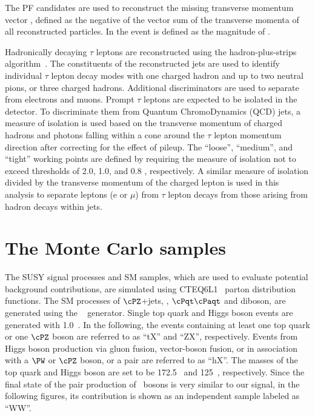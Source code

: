 The PF candidates are used to reconstruct the missing transverse momentum  vector \ptvecmiss, defined as the negative of the vector sum of the transverse momenta of all reconstructed particles.  
In the event \MPT is defined as the magnitude of \ptvecmiss.

Hadronically decaying $\tau$ leptons are reconstructed using the hadron-plus-strips algorithm~\cite{Khachatryan:2015dfa}.
The constituents of the reconstructed jets are used to identify individual $\tau$ lepton decay modes with one charged 
hadron and up to two neutral pions, or three charged hadrons. 
Additional discriminators are used to separate \Tau from electrons and muons.
Prompt $\tau$ leptons are expected to be isolated in the detector.
To discriminate them from Quantum ChromoDynamics (QCD) jets, a measure of isolation \cite{Khachatryan:2014wca} is used 
based on the transverse momentum of charged hadrons and photons falling within 
a cone around the $\tau$ lepton momentum direction after correcting for the effect of
pileup. The ``loose'', ``medium'', and ``tight'' working points are defined
by requiring the measure of isolation not to exceed thresholds of 2.0, 1.0,
and 0.8 \GeV, respectively.
 A similar measure of isolation divided by the transverse momentum of the charged lepton is 
used in this analysis to separate leptons (e or $\mu$) from $\tau$ lepton decays from 
those arising from hadron decays within jets.

\section{The Monte Carlo samples}
\label{sect:MCSamples}
The SUSY signal processes and SM samples, which are used to evaluate potential background contributions, are simulated using CTEQ6L1~\cite{Nadolsky:2008zw} parton distribution functions. The SM processes of $\cPZ$+jets, \wjets, $\cPqt\cPaqt$ and diboson, are generated using the ~\cite{Alwall:2011uj} generator. 
Single top quark and Higgs boson events are generated with {\POWHEG} 1.0~\cite{Nason:2004rx,Frixione:2007vw,Alioli:2009je,Alioli:2010xd}.
In the following, the events containing at least one top quark or one $\cPZ$ boson are referred to as ``tX'' and ``ZX'', respectively. 
Events from Higgs boson production via gluon fusion, vector-boson fusion, or in association with a $\PW$ or $\cPZ$  boson, or a \ttbar pair are referred to as ``hX''. The masses of the top quark and Higgs boson are set to be 172.5\GeV~\cite{Khachatryan:2015hba} and 125\GeV~\cite{Aad:2015zhl}, respectively. Since the 
final state of the pair production of \PW~bosons is very similar to our signal, in the following figures, its contribution is shown as an independent sample 
labeled as ``WW''.

